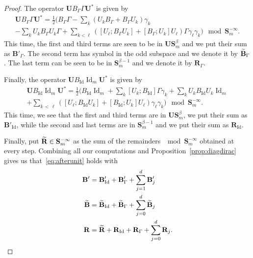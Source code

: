 \documentclass[10pt]{amsart}
\theoremstyle{definition}\newtheorem{defi}[theo]{Definition}\newtheorem{rema}[theo]{Remark}\newtheorem{exam}[theo]{Example}\newtheorem{nota}[theo]{Notation}
\DeclareMathOperator{\Id}{Id}
\newcommand{\BB}{\mathbf B}
\newcommand{\BS}{\mathbf S}
\newcommand{\BR}{\mathbf R}
\newcommand{\BU}{\mathbf U}
\let\oldtilde\tilde
\renewcommand*{\tilde}[1]{\mathchoice{\widetilde{#1}}{\widetilde{#1}}{\oldtilde{#1}}{\oldtilde{#1}}}
\begin{document}
\begin{proof}
The operator $\BU B_\Gamma \Gamma \BU^*$ is given by
\begin{multline}\label{eq:Gammatrans}
\BU B_\Gamma\Gamma \BU^* =
\frac{1}{2}\Bigg(B_\Gamma \Gamma - \sum_{k}(U_k B_\Gamma + B_\Gamma U_k) \gamma_k \\
- \sum_{k} U_k B_\Gamma U_k \Gamma +
\sum_{k < \ell}\left([U_\ell;B_\Gamma U_k] + [B_\Gamma;U_k]U_\ell \right)\Gamma
\gamma_\ell \gamma_k
\bigg) \mod \BS_m^{-\infty}.
\end{multline}
This time, the first and third terms are seen to be in $\BU\BS^\beta_m$ and we put their sum as $\BB'_\Gamma$. The second term has symbol in the odd subspace and we denote it by $\tilde
\BB_\Gamma$. The last term can be seen to be in $\BS_m^{\beta - 1}$ and we denote it by $\BR_{\Gamma}$.

Finally, the operator $\BU B_{\Id} \Id_m \BU^*$ is given by
\begin{multline}\label{eq:Idtrans}
\BU B_{\Id} \Id_m \BU^* =
\frac{1}{2}\Bigg(B_{\Id} \Id_m +
\sum_{k}[U_k;B_{\Id}]\Gamma \gamma_k + \sum_{k} U_k B_{\Id} U_k \Id_m \\
+\sum_{k\,<\,\ell}\left([U_\ell;B_{\Id}U_k] + [B_{\Id};U_k]U_\ell \right)
\gamma_\ell \gamma_k
\Bigg) \mod \BS_m^{-\infty}.
\end{multline}
This time, we see that the first and third terms are in $\BU\BS_m^\beta$, we put their sum as $\BB'_{\Id}$, while the second and last terms are in $\BS_m^{\beta - 1}$ and we put their sum as $\BR_{\Id}$.

Finally, put $\tilde \BR \in \BS_m^{-\infty}$ as the sum of the remainders $\mod \BS_m^{-\infty}$ obtained at every step. Combining all our computations and Proposition~\ref{prop:diagdirac} gives us that~\eqref{eq:afterunit} holds with
\begin{equation}
\begin{aligned}
\BB' &= \BB'_{\Id} + \BB'_{\Gamma} + \sum_{j=1}^d \BB'_j \\
\tilde \BB &= \tilde \BB_{\Id} + \tilde \BB_{\Gamma} + \sum_{j=0}^d \tilde
\BB_j \\
\BR &= \tilde \BR + \BR_{\Id} + \BR_\Gamma + \sum_{j=0}^d \BR_j.
\end{aligned}\qedhere
\end{equation}
\end{proof}
\end{document}

